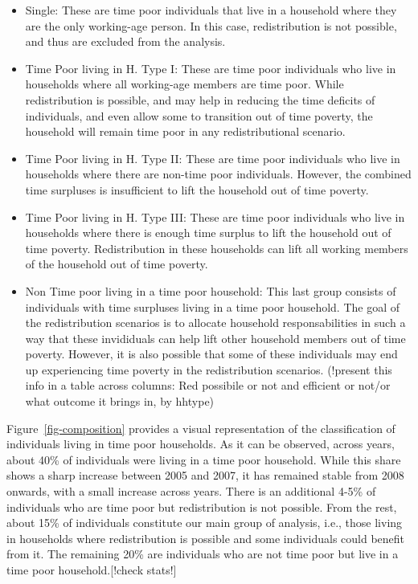 \documentclass[
  11pt,
]{article}
\providecommand{\tightlist}{%
  \setlength{\itemsep}{0pt}\setlength{\parskip}{0pt}}\usepackage{longtable,booktabs,array}
\begin{document}
\begin{itemize}
\tightlist
\item
  Single: These are time poor individuals that live in a household where
  they are the only working-age person. In this case, redistribution is
  not possible, and thus are excluded from the analysis.
\item
  Time Poor living in H. Type I: These are time poor individuals who
  live in households where all working-age members are time poor. While
  redistribution is possible, and may help in reducing the time deficits
  of individuals, and even allow some to transition out of time poverty,
  the household will remain time poor in any redistributional scenario.
\item
  Time Poor living in H. Type II: These are time poor individuals who
  live in households where there are non-time poor individuals. However,
  the combined time surpluses is insufficient to lift the household out
  of time poverty.
\item
  Time Poor living in H. Type III: These are time poor individuals who
  live in households where there is enough time surplus to lift the
  household out of time poverty. Redistribution in these households can
  lift all working members of the household out of time poverty.
\item
  Non Time poor living in a time poor household: This last group
  consists of individuals with time surpluses living in a time poor
  household. The goal of the redistribution scenarios is to allocate
  household responsabilities in such a way that these invididuals can
  help lift other household members out of time poverty. However, it is
  also possible that some of these individuals may end up experiencing
  time poverty in the redistribution scenarios. (!present this info in a
  table across columns: Red possibile or not and efficient or not/or
  what outcome it brings in, by hhtype)
\end{itemize}

Figure~\ref{fig-composition} provides a visual representation of the
classification of individuals living in time poor households. As it can
be observed, across years, about 40\% of individuals were living in a
time poor household. While this share shows a sharp increase between
2005 and 2007, it has remained stable from 2008 onwards, with a small
increase across years. There is an additional 4-5\% of individuals who
are time poor but redistribution is not possible. From the rest, about
15\% of individuals constitute our main group of analysis, i.e., those
living in households where redistribution is possible and some
individuals could benefit from it. The remaining 20\% are individuals
who are not time poor but live in a time poor household.{[}!check
stats!{]}
\end{document}
